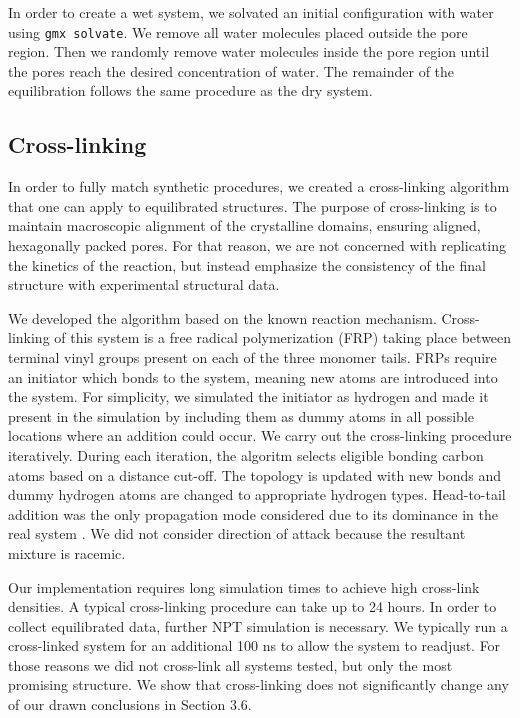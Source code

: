 \documentclass[journal=jpcbfk,manusciprt=article]{achemso}
\begin{document}
  In order to create a wet system, we solvated an initial configuration with
  water using \texttt{gmx solvate}. We remove all water molecules placed outside
  the pore region. Then we randomly remove water molecules inside the pore region
  until the pores reach the desired concentration of water. The remainder of the
  equilibration follows the same procedure as the dry system. 

  \subsection{Cross-linking}
  
  In order to fully match synthetic procedures, we created a cross-linking
  algorithm that one can apply to equilibrated structures. The purpose of
  cross-linking is to maintain macroscopic alignment of the crystalline domains,
  ensuring aligned, hexagonally packed pores. For that reason, we are not
  concerned with replicating the kinetics of the reaction, but instead emphasize
  the consistency of the final structure with experimental structural data. 

  We developed the algorithm based on the known reaction mechanism.
  Cross-linking of this system is a free radical polymerization (FRP) taking
  place between terminal vinyl groups present on each of the three monomer tails.
  FRPs require an initiator which bonds to the system, meaning new atoms are
  introduced into the system. For simplicity, we simulated the initiator as
  hydrogen and made it present in the simulation by including them as dummy atoms
  in all possible locations where an addition could occur. We carry out the
  cross-linking procedure iteratively. During each iteration, the algoritm
  selects eligible bonding carbon atoms based on a distance cut-off. The topology
  is updated with new bonds and dummy hydrogen atoms are changed to appropriate
  hydrogen types.  Head-to-tail addition was the only propagation mode considered
  due to its dominance in the real system \cite{young_introduction_2011}. We did
  not consider direction of attack because the resultant mixture is racemic.

  Our implementation requires long simulation times to achieve high cross-link 
  densities. A typical cross-linking procedure can take up to 24 hours. In
  order to collect equilibrated data, further NPT simulation is necessary. We
  typically run a cross-linked system for an additional 100 ns to allow the system
  to readjust. For those reasons we did not cross-link all systems tested, but only
  the most promising structure. We show that cross-linking does not significantly
  change any of our drawn conclusions in Section 3.6.
\end{document}
